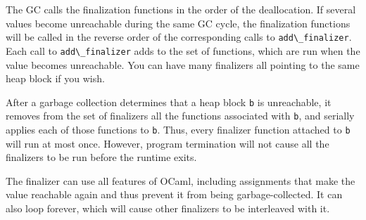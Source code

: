 The GC calls the finalization functions in the order of the
deallocation. If several values become unreachable during the same GC
cycle, the finalization functions will be called in the reverse order of
the corresponding calls to \passthrough{\lstinline!add\_finalizer!}.
Each call to \passthrough{\lstinline!add\_finalizer!} adds to the set of
functions, which are run when the value becomes unreachable. You can
have many finalizers all pointing to the same heap block if you wish.

After a garbage collection determines that a heap block
\passthrough{\lstinline!b!} is unreachable, it removes from the set of
finalizers all the functions associated with
\passthrough{\lstinline!b!}, and serially applies each of those
functions to \passthrough{\lstinline!b!}. Thus, every finalizer function
attached to \passthrough{\lstinline!b!} will run at most once. However,
program termination will not cause all the finalizers to be run before
the runtime exits.

The finalizer can use all features of OCaml, including assignments that
make the value reachable again and thus prevent it from being
garbage-collected. It can also loop forever, which will cause other
finalizers to be interleaved with it.
